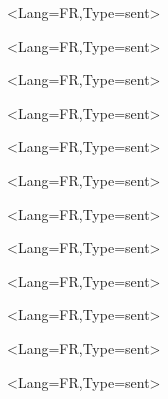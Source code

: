 \documentclass[a5paper,11pt]{article}
\begin{document}
\pagestyle{empty}

\begin{EnvtExo}%
	\ipsum<Lang=FR,Type=sent>
\end{EnvtExo}

\begin{EnvtExo}[Trait=pointilles]%
	\ipsum<Lang=FR,Type=sent>
\end{EnvtExo}

\begin{EnvtExo}[Trait=dashilles]%
	\ipsum<Lang=FR,Type=sent>
\end{EnvtExo}

\begin{EnvtExo}[Decoration=Icone/\faPython]%
	\ipsum<Lang=FR,Type=sent>
\end{EnvtExo}

\begin{EnvtExo}[Decoration=Ceinture/rouge]%
	\ipsum<Lang=FR,Type=sent>
\end{EnvtExo}

\begin{EnvtExo}[Decoration=Chrono/20]%
	\ipsum<Lang=FR,Type=sent>
\end{EnvtExo}

\begin{EnvtExo}[Etoiles=2,Decoration=Image/goku_ssj4]%
	\ipsum<Lang=FR,Type=sent>
\end{EnvtExo}

\begin{EnvtExo}[Decoration=faEtoiles/1.5§4]%
	\ipsum<Lang=FR,Type=sent>
\end{EnvtExo}

\begin{EnvtExo}[Decoration=tkzEtoiles/3.5§5]%
	\ipsum<Lang=FR,Type=sent>
\end{EnvtExo}

\begin{EnvtExo}[Decoration=Points/7]%
	\ipsum<Lang=FR,Type=sent>
\end{EnvtExo}

\begin{EnvtExo}[Type=Perso/{Titre perso },Etoiles={2.5§5}]%
	\ipsum<Lang=FR,Type=sent>
\end{EnvtExo}

\StyleEnvtExo[Couleur=red,CouleurDeco=teal,Police=\bfseries\ttfamily,EpTrait=2pt,Libelle={Exercice n°}]

\begin{EnvtExo}[Decoration=Icone/\faAddressBook]%
	\ipsum<Lang=FR,Type=sent>
\end{EnvtExo}
\end{document}
